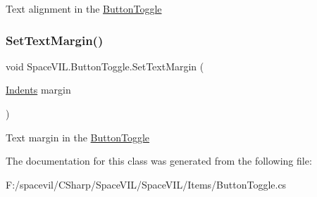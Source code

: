 Text alignment in the \mbox{\hyperlink{class_space_v_i_l_1_1_button_toggle}{Button\+Toggle}} 

\mbox{\label{class_space_v_i_l_1_1_button_toggle_a387ba36cf18f799bbb64615e4925f160}} 
\subsubsection{\texorpdfstring{Set\+Text\+Margin()}{SetTextMargin()}}
{\footnotesize\ttfamily void Space\+V\+I\+L.\+Button\+Toggle.\+Set\+Text\+Margin (\begin{DoxyParamCaption}\item[{\mbox{\hyperlink{struct_space_v_i_l_1_1_decorations_1_1_indents}{Indents}}}]{margin }\end{DoxyParamCaption})}



Text margin in the \mbox{\hyperlink{class_space_v_i_l_1_1_button_toggle}{Button\+Toggle}} 



The documentation for this class was generated from the following file\+:\begin{DoxyCompactItemize}
\item 
F\+:/spacevil/\+C\+Sharp/\+Space\+V\+I\+L/\+Space\+V\+I\+L/\+Items/Button\+Toggle.\+cs\end{DoxyCompactItemize}

